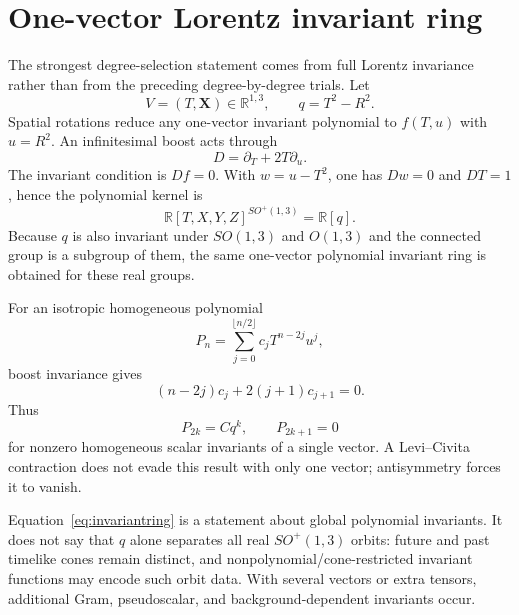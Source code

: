 \documentclass[11pt,a4paper]{article}
\begin{document}
\section{One-vector Lorentz invariant ring}
The strongest degree-selection statement comes from full Lorentz invariance rather than from the preceding degree-by-degree trials.  Let
\begin{equation}
V=(T,\bm X)\in\mathbb R^{1,3},
\qquad
q=T^2-R^2.
\end{equation}
Spatial rotations reduce any one-vector invariant polynomial to $f(T,u)$ with $u=R^2$.  An infinitesimal boost acts through
\begin{equation}
D=\partial_T+2T\partial_u.
\end{equation}
The invariant condition is $Df=0$.  With $w=u-T^2$, one has $Dw=0$ and $DT=1$, hence the polynomial kernel is
\begin{equation}
\boxed{\mathbb R[T,X,Y,Z]^{SO^+(1,3)}=\mathbb R[q]}.
\label{eq:invariantring}
\end{equation}
Because $q$ is also invariant under $SO(1,3)$ and $O(1,3)$ and the connected group is a subgroup of them, the same one-vector polynomial invariant ring is obtained for these real groups.

For an isotropic homogeneous polynomial
\begin{equation}
P_n=\sum_{j=0}^{\lfloor n/2\rfloor}c_jT^{n-2j}u^j,
\end{equation}
boost invariance gives
\begin{equation}
(n-2j)c_j+2(j+1)c_{j+1}=0.
\end{equation}
Thus
\begin{equation}
\boxed{P_{2k}=Cq^k},
\qquad
\boxed{P_{2k+1}=0}
\label{eq:evenoddinv}
\end{equation}
for nonzero homogeneous scalar invariants of a single vector.  A Levi--Civita contraction does not evade this result with only one vector; antisymmetry forces it to vanish.

Equation~\eqref{eq:invariantring} is a statement about global polynomial invariants.  It does not say that $q$ alone separates all real $SO^+(1,3)$ orbits: future and past timelike cones remain distinct, and nonpolynomial/cone-restricted invariant functions may encode such orbit data.  With several vectors or extra tensors, additional Gram, pseudoscalar, and background-dependent invariants occur.
\end{document}

